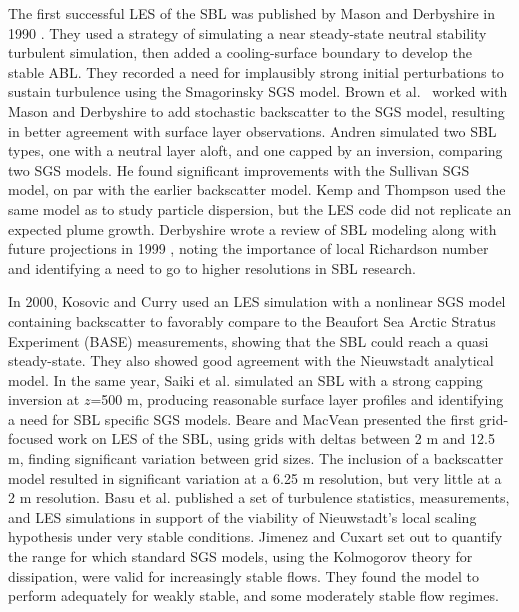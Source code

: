 \documentclass[conf]{new-aiaa}
\begin{document}
The first successful LES of the SBL was published by Mason and Derbyshire in
1990 \cite{Mason1990}. They used a strategy of simulating a near steady-state
neutral stability turbulent simulation, then added a cooling-surface boundary
to develop the stable ABL. They recorded a need for implausibly strong initial
perturbations to sustain turbulence using the Smagorinsky SGS model. Brown et
al.\ \cite{Brown1994} worked with Mason and Derbyshire to add stochastic backscatter
to the SGS model, resulting in better agreement with surface layer observations.
Andren \cite{Andren1995} simulated two SBL types, one with a neutral layer aloft, and
one capped by an inversion, comparing two SGS models. He found significant improvements
with the Sullivan SGS model, on par with the earlier backscatter model. Kemp and
Thompson \cite{Kemp1996} used the same model as \cite{Brown1994} to study particle
dispersion, but the LES code did not replicate an expected plume growth. Derbyshire
wrote a review of SBL modeling along with future projections in 1999 \cite{Derbyshire1999},
noting the importance of local Richardson number and identifying a need to go
to higher resolutions in SBL research.

In 2000, Kosovic and Curry \cite{Kosovic2000} used an LES simulation
with a nonlinear SGS model containing backscatter to favorably compare
to the Beaufort Sea Arctic Stratus Experiment (BASE) measurements,
showing that the SBL could reach a quasi steady-state. They also
showed good agreement with the Nieuwstadt analytical model. In the same
year, Saiki et al. \cite{Saiki2000} simulated an SBL with
a strong capping inversion at $z$=500 m, producing reasonable surface layer profiles and
identifying a need for SBL specific SGS models. Beare and MacVean \cite{Beare2004}
presented the first grid-focused work on LES of the SBL, using grids with deltas
between 2 m and 12.5 m, finding significant variation between grid sizes. The inclusion
of a backscatter model resulted in significant variation at a 6.25 m resolution, but
very little at a 2 m resolution. Basu et al. \cite{Basu2005} published a set of
turbulence statistics, measurements, and LES simulations in support
of the viability of Nieuwstadt's local scaling hypothesis under very stable
conditions. Jimenez and Cuxart \cite{Jimenez2005} set out to quantify the range
for which standard SGS models, using the Kolmogorov theory for dissipation, were
valid for increasingly stable flows. They found the model to perform adequately
for weakly stable, and some moderately stable flow regimes.
\end{document}
